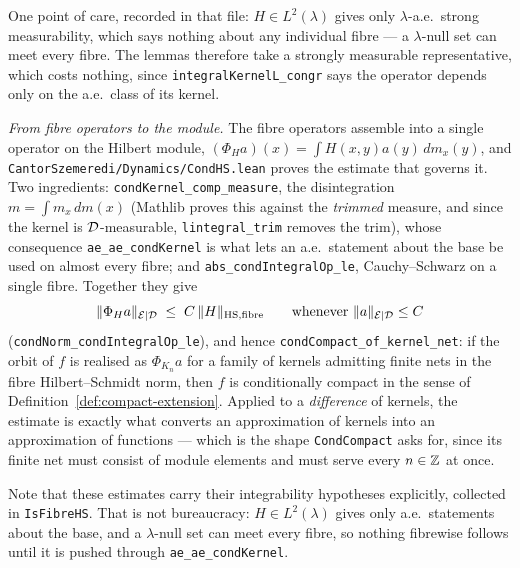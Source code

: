 \begin{remark}
  One point of care, recorded in that file: $H \in L^2(\lambda)$ gives only
  $\lambda$-a.e.\ strong measurability, which says nothing about any individual fibre --- a
  $\lambda$-null set can meet every fibre.  The lemmas therefore take a strongly measurable
  representative, which costs nothing, since \texttt{integralKernelL\_congr} says the operator
  depends only on the a.e.\ class of its kernel.

  \smallskip
  \emph{From fibre operators to the module.}  The fibre operators assemble into a single
  operator on the Hilbert module,
  $(\Phi_H a)(x) = \int H(x,y) a(y) \,dm_x(y)$, and
  \texttt{CantorSzemeredi/Dynamics/CondHS.lean} proves the estimate that governs it.  Two
  ingredients: \texttt{condKernel\_comp\_measure}, the disintegration $m = \int m_x \,dm(x)$
  (Mathlib proves this against the \emph{trimmed} measure, and since the kernel is
  $\mathcal{D}$-measurable, \texttt{lintegral\_trim} removes the trim), whose consequence
  \texttt{ae\_ae\_condKernel} is what lets an a.e.\ statement about the base be used on almost
  every fibre; and \texttt{abs\_condIntegralOp\_le}, Cauchy--Schwarz on a single fibre.
  Together they give
  \[
    \lVert \Phi_H a \rVert_{\mathcal{E}|\mathcal{D}} \;\leq\; C \, \lVert H \rVert_{\mathrm{HS}, \text{fibre}}
    \qquad\text{whenever } \lVert a \rVert_{\mathcal{E}|\mathcal{D}} \leq C
  \]
  (\texttt{condNorm\_condIntegralOp\_le}), and hence
  \texttt{condCompact\_of\_kernel\_net}: if the orbit of $f$ is realised as $\Phi_{K_n} a$ for a
  family of kernels admitting finite nets in the fibre Hilbert--Schmidt norm, then $f$ is
  conditionally compact in the sense of Definition~\ref{def:compact-extension}.  Applied to a
  \emph{difference} of kernels, the estimate is exactly what converts an approximation of
  kernels into an approximation of functions --- which is the shape \texttt{CondCompact} asks
  for, since its finite net must consist of module elements and must serve every $n \in \mathbb{Z}$
  at once.

  Note that these estimates carry their integrability hypotheses explicitly, collected in
  \texttt{IsFibreHS}.  That is not bureaucracy: $H \in L^2(\lambda)$ gives only a.e.\
  statements about the base, and a $\lambda$-null set can meet every fibre, so nothing
  fibrewise follows until it is pushed through \texttt{ae\_ae\_condKernel}.


\end{remark}
